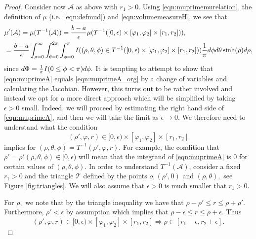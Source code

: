 \documentclass[10pt,a4paper]{amsart}
\newcommand{\CA}{{\mathcal{A}}}
\newcommand{\CT}{{\mathcal{T}}}
\newcommand{\dd}{{\rm d}}
\begin{document}
\begin{proof}
Consider now $\CA$ as above with $r_1>0.$
Using \eqref{eqn:muprimemurelation}, the definition of 
$\mu$ (i.e.\ \eqref{eqn:defmud}) and \eqref{eqn:volumemeasureH},
we see that 
\begin{align} \label{eqn:muprimeA}
    & \mu'(\CA)=\mu(T^{-1}(\CA)) 
    =\frac{b-a}{\epsilon}\mu(T^{-1}([0,\epsilon) \times [\varphi_1,\varphi_2]\times [r_1,r_2] )),\\
& =\frac{b-a}{\epsilon }\int_{\rho=0}^\infty \int_{\theta=0}^{2 \pi} \int_{\phi=0}^{\pi} 
I((\rho,\theta,\phi)\in T^{-1}([0,\epsilon) \times [\varphi_1,\varphi_2]\times [r_1,r_2] )) 
\frac{1}{\pi}\dd \phi \dd \theta \sinh(\rho) \dd \rho, 
\nonumber 
\end{align}
since $\dd \Phi=\frac{1}{\pi}I(0\leq \phi< \pi)\dd \phi.$
It is tempting to attempt to 
show that \eqref{eqn:muprimeA} equals \eqref{eqn:muprimeA_org} by a change of 
variables and calculating the Jacobian. However, this turns out to be rather 
involved and instead we opt for a more direct approach which will be simplified by 
taking $\epsilon>0$ small.
Indeed, we will proceed by estimating the right hand side of \eqref{eqn:muprimeA},
and then we will take the limit as $\epsilon \to 0.$ We therefore need to 
understand what the condition
\[
(\rho',\varphi,r)\in [0,\epsilon)\times [\varphi_1,\varphi_2]\times [r_1,r_2]
\]
implies for $(\rho,\theta,\phi)= T^{-1}(\rho',\varphi,r)$. 
For example, the condition 
that $\rho'=\rho'(\rho,\theta,\phi)\in[0,\epsilon)$ will mean that the integrand 
of \eqref{eqn:muprimeA} is 0 for certain values of $(\rho,\theta,\phi).$
In order to understand $T^{-1}(\CA)$, consider a fixed $r_1>0$ and 
the triangle $\CT$ defined by the points $o,(\rho',0)$ and $(\rho,\theta),$
see Figure \ref{fig:triangles}. 
We will also assume that $\epsilon>0$ is much smaller 
that $r_1>0.$ 

For $\rho,$ we note that by the triangle inequality 
we have that $\rho-\rho' \leq r \leq \rho +\rho'.$ Furthermore, $\rho'<\epsilon$ 
by assumption which implies that $\rho-\epsilon \leq r \leq \rho +\epsilon.$ Thus
\begin{equation} \label{eqn:rhoimpliedbounds}
(\rho',\varphi,r)\in[0,\epsilon) \times [\varphi_1,\varphi_2]
\times [r_1,r_2] 
\Rightarrow \rho\in[r_1-\epsilon,r_2+\epsilon] .
\end{equation}
  



\end{proof}
\end{document}
